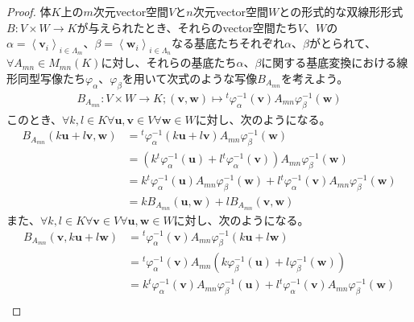 \documentclass[dvipdfmx]{jsarticle}
\begin{document}
\begin{proof}
体$K$上の$m$次元vector空間$V$と$n$次元vector空間$W$との形式的な双線形形式$B:V \times W \rightarrow K$が与えられたとき、それらのvector空間たち$V$、$W$の$\alpha = \left\langle \mathbf{v}_{i} \right\rangle_{i \in \varLambda_{m}}$、$\beta = \left\langle \mathbf{w}_{i} \right\rangle_{i \in \varLambda_{n}}$なる基底たちそれぞれ$\alpha$、$\beta$がとられて、$\forall A_{mn} \in M_{mn}(K)$に対し、それらの基底たち$\alpha$、$\beta$に関する基底変換における線形同型写像たち$\varphi_{\alpha}$、$\varphi_{\beta}$を用いて次式のような写像$B_{A_{mn}}$を考えよう。
\begin{align*}
B_{A_{mn}}:V \times W \rightarrow K;\left( \mathbf{v},\mathbf{w} \right) \mapsto{}^{t}\varphi_{\alpha}^{- 1}\left( \mathbf{v} \right)A_{mn}\varphi_{\beta}^{- 1}\left( \mathbf{w} \right)
\end{align*}
このとき、$\forall k,l \in K\forall\mathbf{u},\mathbf{v} \in V\forall\mathbf{w} \in W$に対し、次のようになる。
\begin{align*}
B_{A_{mn}}\left( k\mathbf{u} + l\mathbf{v},\mathbf{w} \right) &={}^{t}\varphi_{\alpha}^{- 1}\left( k\mathbf{u} + l\mathbf{v} \right)A_{mn}\varphi_{\beta}^{- 1}\left( \mathbf{w} \right)\\
&= \left( k{}^{t}\varphi_{\alpha}^{- 1}\left( \mathbf{u} \right) + l{}^{t}\varphi_{\alpha}^{- 1}\left( \mathbf{v} \right) \right)A_{mn}\varphi_{\beta}^{- 1}\left( \mathbf{w} \right)\\
&= k{}^{t}\varphi_{\alpha}^{- 1}\left( \mathbf{u} \right)A_{mn}\varphi_{\beta}^{- 1}\left( \mathbf{w} \right) + l{}^{t}\varphi_{\alpha}^{- 1}\left( \mathbf{v} \right)A_{mn}\varphi_{\beta}^{- 1}\left( \mathbf{w} \right)\\
&= kB_{A_{mn}}\left( \mathbf{u},\mathbf{w} \right) + lB_{A_{mn}}\left( \mathbf{v},\mathbf{w} \right)
\end{align*}
また、$\forall k,l \in K\forall\mathbf{v} \in V\forall\mathbf{u},\mathbf{w} \in W$に対し、次のようになる。
\begin{align*}
B_{A_{mn}}\left( \mathbf{v},k\mathbf{u} + l\mathbf{w} \right) &={}^{t}\varphi_{\alpha}^{- 1}\left( \mathbf{v} \right)A_{mn}\varphi_{\beta}^{- 1}\left( k\mathbf{u} + l\mathbf{w} \right)\\
&={}^{t}\varphi_{\alpha}^{- 1}\left( \mathbf{v} \right)A_{mn}\left( k\varphi_{\beta}^{- 1}\left( \mathbf{u} \right) + l\varphi_{\beta}^{- 1}\left( \mathbf{w} \right) \right)\\
&= k{}^{t}\varphi_{\alpha}^{- 1}\left( \mathbf{v} \right)A_{mn}\varphi_{\beta}^{- 1}\left( \mathbf{u} \right) + l{}^{t}\varphi_{\alpha}^{- 1}\left( \mathbf{v} \right)A_{mn}\varphi_{\beta}^{- 1}\left( \mathbf{w} \right)\\

\end{align*}
\end{proof}
\end{document}
